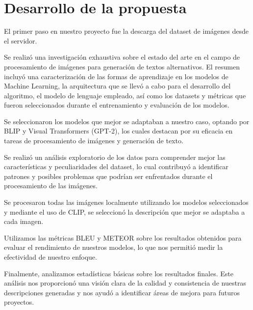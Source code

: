 \chapter{Desarrollo de la propuesta}\label{chapter:desarrollo}
El primer paso en nuestro proyecto fue la descarga del dataset de imágenes desde el servidor.

Se realizó una investigación exhaustiva sobre el estado del arte en el campo de procesamiento de imágenes para generación de textos alternativos. El resumen incluyó una caracterización de las formas de aprendizaje en los modelos de Machine Learning, la arquitectura que se llevó a cabo para el desarrollo del algoritmo, el modelo de lenguaje empleado, así como los datasets y métricas que fueron seleccionados durante el entrenamiento y evaluación de los modelos. 

Se seleccionaron los modelos que mejor se adaptaban a nuestro caso, optando por BLIP y Visual Transformers (GPT-2), los cuales destacan por su eficacia en tareas de procesamiento de imágenes y generación de texto. 

Se realizó un análisis exploratorio de los datos para comprender mejor las características y peculiaridades del dataset, lo cual contribuyó a identificar patrones y posibles problemas que podrían ser enfrentados durante el procesamiento de las imágenes.

Se procesaron todas las imágenes localmente utilizando los modelos seleccionados y mediante el uso de CLIP, se seleccionó la descripción que mejor se adaptaba a cada imagen.

Utilizamos las métricas BLEU y METEOR sobre los resultados obtenidos para evaluar el rendimiento de nuestros modelos, lo que nos permitió medir la efectividad de nuestro enfoque.

Finalmente, analizamos estadísticas básicas sobre los resultados finales. Este análisis nos proporcionó una visión clara de la calidad y consistencia de nuestras descripciones generadas y nos ayudó a identificar áreas de mejora para futuros proyectos.